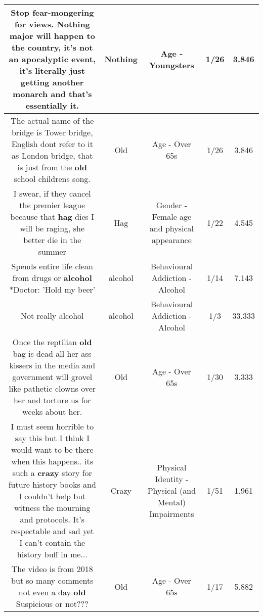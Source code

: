 \documentclass[11pt]{article}
\newlength\mylength
\begin{document}
\begin{center}
\begin{longtable}{|C{.65\mylength}|C{.30\mylength}|C{.12\mylength}|C{.12\mylength}|C{.12\mylength}|}
  \small Stop fear-mongering for views. \textbf{Nothing} major will happen to the country, it's not an apocalyptic event, it's literally just getting another monarch and that's essentially it.\normalsize   & Nothing & Age - Youngsters & 1/26 & 3.846 \\  \hline
  \small The actual name of the bridge is Tower bridge, English dont refer to it as London bridge, that is just from the \textbf{old} school childrens song.\normalsize   & Old & Age - Over 65s & 1/26 & 3.846 \\  \hline
  \small I swear, if they cancel the premier league because that \textbf{hag} dies I will be raging, she better die in the summer\normalsize   & Hag & Gender - Female age and physical appearance & 1/22 & 4.545 \\  \hline
  \small * Spends entire life clean from drugs or \textbf{alcohol} *Doctor: 'Hold my beer'\normalsize   & alcohol & Behavioural Addiction - Alcohol & 1/14 & 7.143 \\  \hline
  \small Not really alcohol\normalsize   & alcohol & Behavioural Addiction - Alcohol & 1/3 & 33.333 \\  \hline
  \small Once the reptilian \textbf{old} bag is dead all her ass kissers in the media and government will grovel like pathetic clowns over her and torture us for weeks about her.\normalsize   & Old & Age - Over 65s & 1/30 & 3.333 \\  \hline
  \small I must seem horrible to say this but I think I would want to be there when this happens.. its such a \textbf{crazy} story for future history books and I couldn't help but witness the mourning and protocols. It's respectable and sad yet I can't contain the history buff in me...\normalsize   & Crazy & Physical Identity - Physical (and Mental) Impairments & 1/51 & 1.961 \\  \hline
  \small The video is from 2018 but so many comments not even a day \textbf{old} Suspicious or not???\normalsize   & Old & Age - Over 65s & 1/17 & 5.882 \\  \hline

\end{longtable}
\end{center}
\end{document}
